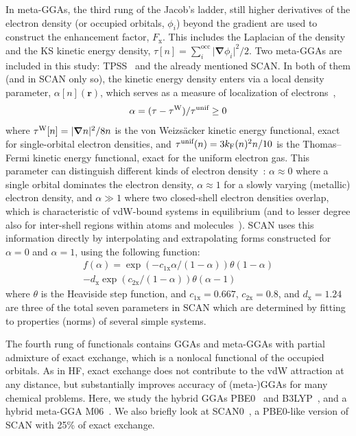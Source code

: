 In meta-GGAs, the third rung of the Jacob's ladder, still higher derivatives of the electron density (or occupied orbitals, $\phi_i$) beyond the gradient are used to construct the enhancement factor, $F_\mathrm x$.
This includes the Laplacian of the density and the KS kinetic energy density, $\tau[n]=\sum_i^\text{occ}\lvert\boldsymbol\nabla\phi_i\rvert^2/2$.
Two meta-GGAs are included in this study: TPSS~\cite{TaoPRL03} and the already mentioned SCAN\@.
In both of them (and in SCAN only so), the kinetic energy density enters via a local density parameter, $\alpha[n](\mathbf r)$, which serves as a measure of localization of electrons~\cite{BeckeJCP90},
\begin{equation}
  \alpha=(\tau-\tau^\text W)/\tau^\text{unif}\geq0
\end{equation}
where $\tau^\text W[n]=\lvert\boldsymbol\nabla n\rvert^2/8n$ is the von Weizsäcker kinetic energy functional, exact for single-orbital electron densities, and $\tau^\text{unif}(n)=3k_\text F(n)^2n/10$ is the Thomas--Fermi kinetic energy functional, exact for the uniform electron gas.
This parameter can distinguish different kinds of electron density~\cite{SunPRL13}: $\alpha\approx0$ where a single orbital dominates the electron density, $\alpha\approx1$ for a slowly varying (metallic) electron density, and $\alpha\gg1$ where two closed-shell electron densities overlap, which is characteristic of vdW-bound systems in equilibrium (and to lesser degree also for inter-shell regions within atoms and molecules~\cite{BeckeJCP90}).
SCAN uses this information directly by interpolating and extrapolating forms constructed for $\alpha=0$ and $\alpha=1$, using the following function:
\begin{multline}
  f(\alpha)=\exp(-c_\mathrm{1x}\alpha/(1-\alpha))\theta(1-\alpha)\\
  -d_\mathrm x\exp(c_\mathrm{2x}/(1-\alpha))\theta(\alpha-1)
  \label{eq:scan-interp}
\end{multline}
where $\theta$ is the Heaviside step function, and $c_\mathrm{1x}=0.667$, $c_\mathrm{2x}=0.8$, and $d_\mathrm x=1.24$ are three of the total seven parameters in SCAN which are determined by fitting to properties (norms) of several simple systems.

The fourth rung of functionals contains GGAs and meta-GGAs with partial admixture of exact exchange, which is a nonlocal functional of the occupied orbitals.
As in HF, exact exchange does not contribute to the vdW attraction at any distance, but substantially improves accuracy of (meta-)GGAs for many chemical problems. %
Here, we study the hybrid GGAs PBE0~\cite{PerdewJCP96,AdamoJCP99} and B3LYP~\cite{BeckeJCP93}, and a hybrid meta-GGA M06~\cite{ZhaoTCA08}.
We also briefly look at SCAN0~\cite{HuiJCP16}, a PBE0-like version of SCAN with 25\% of exact exchange.

